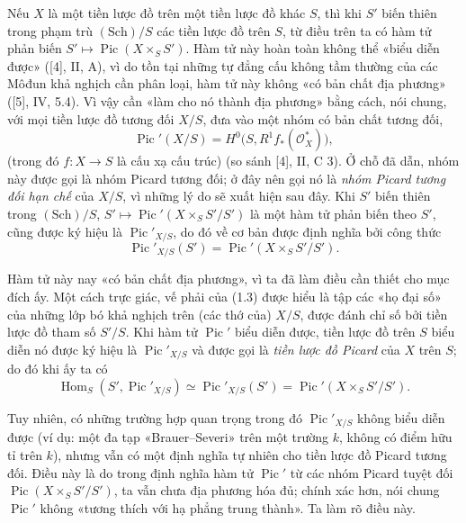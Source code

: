 \documentclass[11pt,twoside,openany]{book}
\numberwithin{equation}{section}
\newcommand{\src}[1]{%
  \phantomsection\hypertarget{src:\fgasourceid:#1}{}%
  \marginpar{\raggedleft\footnotesize\sffamily #1}%
}
\newcommand{\fgasourceid}{unset}
\begin{document}
Nếu $X$ là một tiền lược đồ trên một tiền lược đồ khác $S$, thì khi $S'$ biến
thiên trong phạm trù $(\mathrm{Sch})/S$ các tiền lược đồ trên $S$, từ điều trên
ta có hàm tử phản biến
$S'\longmapsto\operatorname{Pic}(X\times_S S')$. Hàm tử này hoàn toàn không
thể «biểu diễn được» ([4], II, A), vì do tồn tại những tự đẳng cấu không tầm
thường của các Môđun khả nghịch cần phân loại, hàm tử này không «có bản chất
địa phương» ([5], IV, 5.4). Vì vậy cần «làm cho nó thành địa phương» bằng cách,
nói chung, với mọi tiền lược đồ tương đối $X/S$, đưa vào một nhóm có bản chất
tương đối,
\begin{equation}
\operatorname{Pic}'(X/S)=H^0\bigl(S,R^1f_*(\mathcal O_X^*)\bigr),
\tag{1.2}
\end{equation}
(trong đó $f:X\longrightarrow S$ là cấu xạ cấu trúc) (so sánh [4], II,
C 3). Ở chỗ đã dẫn, nhóm này được gọi là nhóm Picard tương đối; ở đây nên gọi
nó là \emph{nhóm Picard tương đối hạn chế} của $X/S$, vì những lý do sẽ xuất
hiện sau đây. Khi $S'$ biến thiên trong $(\mathrm{Sch})/S$,
$S'\longmapsto\operatorname{Pic}'(X\times_S S'/S')$ là một hàm tử phản biến
theo $S'$, cũng được ký hiệu là $\operatorname{Pic}'_{X/S}$, do đó về cơ bản
được định nghĩa bởi công thức
\begin{equation}
\operatorname{Pic}'_{X/S}(S')=
\operatorname{Pic}'(X\times_S S'/S').
\tag{1.3}
\end{equation}
\src{144}
Hàm tử này nay «có bản chất địa phương», vì ta đã làm điều cần thiết cho mục
đích ấy. Một cách trực giác, vế phải của (1.3) được hiểu là tập các «họ đại số»
của những lớp bó khả nghịch trên (các thớ của) $X/S$, được đánh chỉ số bởi tiền
lược đồ tham số $S'/S$. Khi hàm tử $\operatorname{Pic}'$ biểu diễn được, tiền
lược đồ trên $S$ biểu diễn nó được ký hiệu là $\operatorname{Pic}'_{X/S}$ và
được gọi là \emph{tiền lược đồ Picard} của $X$ trên $S$; do đó khi ấy ta có
\begin{equation}
\operatorname{Hom}_S(S',\operatorname{Pic}'_{X/S})
\simeq\operatorname{Pic}'_{X/S}(S')
=\operatorname{Pic}'(X\times_S S'/S').
\tag{1.4}
\end{equation}

Tuy nhiên, có những trường hợp quan trọng trong đó
$\operatorname{Pic}'_{X/S}$ không biểu diễn được (ví dụ: một đa tạp
«Brauer--Severi» trên một trường $k$, không có điểm hữu tỉ trên $k$), nhưng vẫn
có một định nghĩa tự nhiên cho tiền lược đồ Picard tương đối. Điều này là do
trong định nghĩa hàm tử $\operatorname{Pic}'$ từ các nhóm Picard tuyệt đối
$\operatorname{Pic}(X\times_S S'/S')$, ta vẫn chưa địa phương hóa đủ; chính
xác hơn, nói chung $\operatorname{Pic}'$ không «tương thích với hạ phẳng trung
thành». Ta làm rõ điều này.
\end{document}
